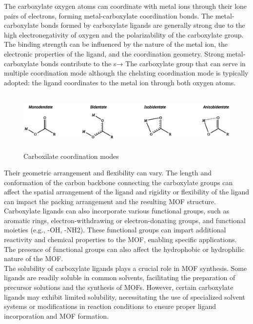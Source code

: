 \documentclass[../Master.tex]{subfiles}
\begin{document}
The carboxylate oxygen atoms can coordinate with metal ions through their lone pairs of electrons, forming metal-carboxylate coordination bonds. The metal-carboxylate bonds formed by carboxylate ligands are generally strong due to the high electronegativity of oxygen and the polarizability of the carboxylate group. The binding strength can be influenced by the nature of the metal ion, the electronic properties of the ligand, and the coordination geometry. Strong metal-carboxylate bonds contribute to the s→
The carboxylate group that can serve in multiple coordination mode although the chelating coordination mode is typically adopted: the ligand coordinates to the metal ion through both oxygen atoms.\\

\begin{figure}[h!]
	\centering
	\includegraphics[width=16cm,height=3cm,keepaspectratio]{Structures/carboxcordmode.eps}
	\caption{Carboxilate coordination modes}\label{fig:carboxcordmode}
\end{figure}

Their geometric arrangement and flexibility can vary. The length and conformation of the carbon backbone connecting the carboxylate groups can affect the spatial arrangement of the ligand and rigidity or flexibility of the ligand can impact the packing arrangement and the resulting MOF structure. \\
Carboxylate ligands can also incorporate various functional groups, such as aromatic rings, electron-withdrawing or electron-donating groups, and functional moieties (e.g., -OH, -NH2). These functional groups can impart additional reactivity and chemical properties to the MOF, enabling specific applications. The presence of functional groups can also affect the hydrophobic or hydrophilic nature of the MOF.\\
The solubility of carboxylate ligands plays a crucial role in MOF synthesis. Some ligands are readily soluble in common solvents, facilitating the preparation of precursor solutions and the synthesis of MOFs. However, certain carboxylate ligands may exhibit limited solubility, necessitating the use of specialized solvent systems or modifications in reaction conditions to ensure proper ligand incorporation and MOF formation.
\end{document}
